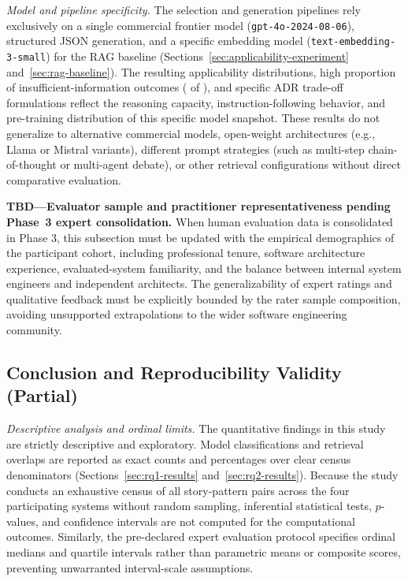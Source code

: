 \emph{Model and pipeline specificity.}
The selection and generation pipelines rely exclusively on a single
commercial frontier model (\texttt{gpt-4o-2024-08-06}), structured JSON
generation, and a specific embedding model (\texttt{text-embedding-3-small})
for the RAG baseline (Sections~\ref{sec:applicability-experiment}
and~\ref{sec:rag-baseline}).
The resulting applicability distributions, high proportion of
insufficient-information outcomes (\StudyInsufficientInformationCount{} of
\StudyAssessmentCount{}), and specific ADR trade-off formulations reflect
the reasoning capacity, instruction-following behavior, and pre-training
distribution of this specific model snapshot.
These results do not generalize to alternative commercial models, open-weight
architectures (e.g., Llama or Mistral variants), different prompt strategies
(such as multi-step chain-of-thought or multi-agent debate), or other
retrieval configurations without direct comparative evaluation.

\noindent\textbf{TBD---Evaluator sample and practitioner representativeness
pending Phase~3 expert consolidation.} When human evaluation data is
consolidated in Phase 3, this subsection must be updated with the empirical
demographics of the participant cohort, including professional tenure,
software architecture experience, evaluated-system familiarity, and the
balance between internal system engineers and independent architects.
The generalizability of expert ratings and qualitative feedback must be
explicitly bounded by the rater sample composition, avoiding unsupported
extrapolations to the wider software engineering community.

\subsection{Conclusion and Reproducibility Validity (Partial)}
\label{sec:conclusion-validity}

\emph{Descriptive analysis and ordinal limits.}
The quantitative findings in this study are strictly descriptive and
exploratory. Model classifications and retrieval overlaps are reported
as exact counts and percentages over clear census denominators
(Sections~\ref{sec:rq1-results} and~\ref{sec:rq2-results}).
Because the study conducts an exhaustive census of all \StudyAssessmentCount{}
story-pattern pairs across the four participating systems without random
sampling, inferential statistical tests, $p$-values, and confidence
intervals are not computed for the computational outcomes.
Similarly, the pre-declared expert evaluation protocol specifies ordinal
medians and quartile intervals rather than parametric means or composite scores,
preventing unwarranted interval-scale assumptions.

